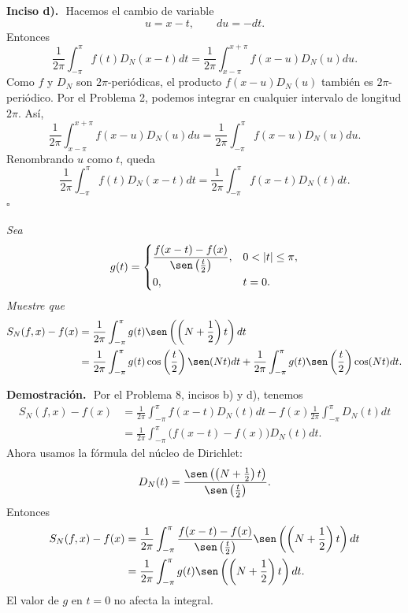 \documentclass[11pt,letterpaper]{article}
\begin{document}
\textbf{Inciso d).}\,\
Hacemos el cambio de variable
\begin{equation*}
    u=x-t,
    \qquad du=-dt.
\end{equation*}
Entonces
\begin{equation*}
    \frac{1}{2\pi}\int_{-\pi}^{\pi}f(t)D_N(x-t)dt
    =\frac{1}{2\pi}\int_{x-\pi}^{x+\pi}f(x-u)D_N(u)du.
\end{equation*}
Como $f$ y $D_N$ son $2\pi$-periódicas, el producto $f(x-u)D_N(u)$ también es $2\pi$-periódico. Por el Problema 2, podemos integrar en cualquier intervalo de longitud $2\pi$. Así,
\begin{equation*}
    \frac{1}{2\pi}\int_{x-\pi}^{x+\pi}f(x-u)D_N(u)du
    =\frac{1}{2\pi}\int_{-\pi}^{\pi}f(x-u)D_N(u)du.
\end{equation*}
Renombrando $u$ como $t$, queda
\begin{equation*}
    \frac{1}{2\pi}\int_{-\pi}^{\pi}f(t)D_N(x-t)dt 
    =\frac{1}{2\pi}\int_{-\pi}^{\pi}f(x-t)D_N(t)dt.
\end{equation*}
\hfill $\square$
\begin{tcolorbox}[title=\textcolor{white}{Problema 9}]
\textit{Sea}
\begin{equation*}
    g(t)=
    \begin{cases}
    \displaystyle \frac{f(x-t)-f(x)}{\sen\left(\frac{t}{2}\right)}, & 0<|t|\leq \pi,\\[0.3cm]
    0, & t=0.
    \end{cases}
\end{equation*}
\textit{Muestre que}
\begin{align*}
    S_N(f,x)-f(x)
    &=\frac{1}{2\pi}\int_{-\pi}^{\pi}g(t)\sen\left(\left(N+\frac12\right)t\right)dt \\
    &=\frac{1}{2\pi}\int_{-\pi}^{\pi}g(t)\cos\left(\frac{t}{2}\right)\sen(Nt)dt
    +\frac{1}{2\pi}\int_{-\pi}^{\pi}g(t)\sen\left(\frac{t}{2}\right)\cos(Nt)dt.
\end{align*}
\end{tcolorbox}

\textbf{Demostración.}\,\
Por el Problema 8, incisos b) y d), tenemos
\begin{align*}
    S_N(f,x)-f(x)
    &=\frac{1}{2\pi}\int_{-\pi}^{\pi}f(x-t)D_N(t)dt
      -f(x)\frac{1}{2\pi}\int_{-\pi}^{\pi}D_N(t)dt \\
    &=\frac{1}{2\pi}\int_{-\pi}^{\pi}\bigl(f(x-t)-f(x)\bigr)D_N(t)dt.
\end{align*}
Ahora usamos la fórmula del núcleo de Dirichlet:
\begin{equation*}
    D_N(t)=\frac{\sen\left(\left(N+\frac12\right)t\right)}{\sen\left(\frac{t}{2}\right)}.
\end{equation*}
Entonces
\begin{align*}
    S_N(f,x)-f(x)
    &=\frac{1}{2\pi}\int_{-\pi}^{\pi}
    \frac{f(x-t)-f(x)}{\sen\left(\frac{t}{2}\right)}
    \sen\left(\left(N+\frac12\right)t\right)dt \\
    &=\frac{1}{2\pi}\int_{-\pi}^{\pi}g(t)\sen\left(\left(N+\frac12\right)t\right)dt.
\end{align*}
El valor de $g$ en $t=0$ no afecta la integral.
\end{document}
